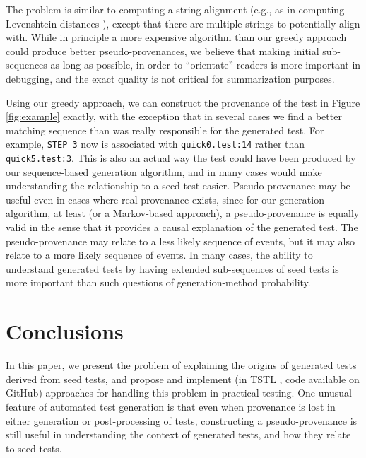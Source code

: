 \documentclass[final]{article}
\begin{document}
The problem is similar to computing a string alignment (e.g., as in
computing Levenshtein distances \cite{lev}), except that there are
multiple strings to potentially align with.  While in principle a more
expensive algorithm than our greedy approach could produce better
pseudo-provenances, we believe that making initial sub-sequences as
long as possible, in order to ``orientate'' readers is more
important in debugging, and the exact quality is not critical for summarization
purposes.

Using our greedy approach, we can construct the provenance of the test
in Figure \ref{fig:example} exactly, with the exception that in
several cases we find a better matching sequence than was really
responsible for the generated test.  For example, {\tt STEP 3} now is
associated with {\tt quick0.test:14} rather than {\tt quick5.test:3}.
This is also an actual way the test could have been produced by our
sequence-based generation
algorithm, and in many cases would make understanding the relationship
to a seed test easier.  Pseudo-provenance may be useful even in cases
where real provenance exists, since for our generation algorithm, at least (or a
Markov-based approach), a pseudo-provenance is equally valid in the
sense that it provides a causal explanation of the generated test.
The pseudo-provenance may relate to a less likely sequence of events,
but it may also relate to a more likely sequence of events.  In many
cases, the ability to understand generated tests by having extended
sub-sequences of seed tests is more important than such questions of
generation-method probability.

\section{Conclusions}

In this paper, we present the problem of explaining the origins of
generated tests derived from seed tests, and propose and implement (in TSTL
\cite{tstl}, code available on GitHub) approaches for
handling this problem in practical testing.  One unusual feature of automated test
generation is that even when provenance is lost in either generation
or post-processing of tests, constructing a pseudo-provenance is still
useful in understanding the context of generated tests, and how they
relate to seed tests.





\end{document}
